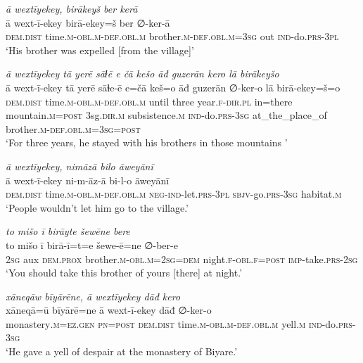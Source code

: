\ea \label{DG.15}
\textit{ā wextīyekey, birākeyš ber kerā} \\ 
\gll ā wext-ī-ekey birā-ekey=š ber ∅-ker-ā \\ 
 \textsc{dem.dist} time\textsc{.m}\textsc{-obl}\textsc{.m}\textsc{-def}\textsc{.obl}\textsc{.m} brother\textsc{.m}\textsc{-def}\textsc{.obl}\textsc{.m}\textsc{=3sg} out \textsc{ind-}do\textsc{.prs}\textsc{-3pl} \\ 
\glt `His brother was expelled [from the village]'
\z 
 
\ea \label{DG.21}
\textit{ā wextīyekey tā yerē sāɫē e čā kešo āđ guzerān kero lā birākeyšo} \\ 
\gll ā wext-ī-ekey tā yerē sāɫe-ē e=čā keš=o āđ guzerān ∅-ker-o lā birā-ekey=š=o \\ 
 \textsc{dem.dist} time\textsc{.m}\textsc{-obl}\textsc{.m}\textsc{-def}\textsc{.obl}\textsc{.m} until three year\textsc{\textsc{.f}}\textsc{-dir}\textsc{.pl} in=there mountain\textsc{.m}\textsc{=\textsc{post}} 3sg\textsc{.dir}\textsc{.m} subsistence\textsc{.m} \textsc{ind-}do\textsc{.prs}\textsc{-3sg} at\_the\_place\_of brother\textsc{.m}\textsc{-def}\textsc{.obl}\textsc{.m}\textsc{=3sg}\textsc{=\textsc{post}} \\ 
\glt `For three years, he stayed with his brothers in those mountains '
\z 
 
\ea \label{DG.23}
\textit{ā wextīyekey, nimāzā bilo āweyānī} \\ 
\gll ā wext-ī-ekey ni-m-āz-ā bi-l-o āweyānī \\ 
 \textsc{dem.dist} time\textsc{.m}\textsc{-obl}\textsc{.m}\textsc{-def}\textsc{.obl}\textsc{.m} \textsc{neg-}\textsc{ind-}let\textsc{.prs}\textsc{-3pl} \textsc{sbjv-}go\textsc{.prs}\textsc{-3sg} habitat\textsc{\textsc{.m}} \\ 
\glt `People wouldn’t let him go to the village.'
\z 
 
\ea \label{DG.26}
\textit{to mišo ī birāyte šewēne bere} \\ 
\gll to mišo ī birā-ī=t=e šewe-ē=ne ∅-ber-e \\ 
 \textsc{2sg} aux \textsc{dem.prox} brother\textsc{.m}\textsc{-obl}\textsc{.m}\textsc{=\textsc{2sg}}\textsc{=dem} night\textsc{\textsc{.f}}\textsc{-obl}\textsc{\textsc{.f}}\textsc{=\textsc{post}} \textsc{imp-}take\textsc{.prs}-\textsc{2sg} \\ 
\glt `You should take this brother of yours [there] at night.'
\z 
 
\ea \label{DG.33}
\textit{xāneqāw bīyārēne, ā wextīyekey dāđ kero} \\ 
\gll xāneqā=ū bīyārē=ne ā wext-ī-ekey dāđ ∅-ker-o \\ 
 monastery\textsc{.m}\textsc{=ez}\textsc{.gen} \textsc{pn}\textsc{=\textsc{post}} \textsc{dem.dist} time\textsc{.m}\textsc{-obl}\textsc{.m}\textsc{-def}\textsc{.obl}\textsc{.m} yell\textsc{.m} \textsc{ind-}do\textsc{.prs}\textsc{-3sg} \\ 
\glt `He gave a yell of despair at the monastery of Biyare.'
\z 
 
